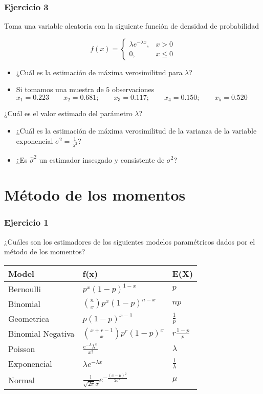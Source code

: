 \documentclass[
]{book}
\begin{document}
\hypertarget{ejercicio-3-6}{%
\subsubsection{Ejercicio 3}\label{ejercicio-3-6}}

Toma una variable aleatoria con la siguiente función de densidad de probabilidad

\[
    f(x)= 
\begin{cases}
    \lambda e^{-\lambda x},&  x > 0 \\
    0,& x\leq 0  
\end{cases}
\]

\begin{itemize}
\item
  ¿Cuál es la estimación de máxima verosimilitud para \(\lambda\)?
\item
  Si tomamos una muestra de \(5\) observaciones
  \(x_1 = 0.223 \qquad x_2 = 0.681; \qquad x_3 = 0.117; \qquad x_4 = 0.150; \qquad x_5 = 0.520\)
\end{itemize}

¿Cuál es el valor estimado del parámetro \(\lambda\)?

\begin{itemize}
\item
  ¿Cuál es la estimación de máxima verosimilitud de la varianza de la variable exponencial \(\sigma^2=\frac{1}{\lambda^2}\)?
\item
  ¿Es \(\hat{\sigma}^2\) un estimador insesgado y consistente de \(\sigma^2\)?
\end{itemize}

\hypertarget{muxe9todo-de-los-momentos-1}{%
\section{Método de los momentos}\label{muxe9todo-de-los-momentos-1}}

\hypertarget{ejercicio-1-10}{%
\subsubsection{Ejercicio 1}\label{ejercicio-1-10}}

¿Cuáles son los estimadores de los siguientes modelos paramétricos dados por el método de los momentos?

\begin{longtable}[]{@{}lll@{}}
\toprule
Model & f(x) & E(X) \\
\midrule
\endhead
Bernoulli & \(p^x(1-p)^{1-x}\) & \(p\) \\
Binomial & \(\binom n x p^x(1-p)^{n-x}\) & \(np\) \\
Geometrica & \(p(1-p)^{x-1}\) & \(\frac{1}{p}\) \\
Binomial Negativa & \(\binom {x+r-1} x p^r(1-p)^x\) & \(r\frac{1-p}{p}\) \\
Poisson & \(\frac{e^{-\lambda}\lambda^x}{x!}\) & \(\lambda\) \\
Exponencial & \(\lambda e^{-\lambda x}\) & \(\frac{1}{\lambda}\) \\
Normal & \(\frac{1}{\sqrt{2\pi}\sigma}e^{-\frac{(x-\mu)^2}{2\sigma^2}}\) & \(\mu\) \\
\bottomrule
\end{longtable}
\end{document}
